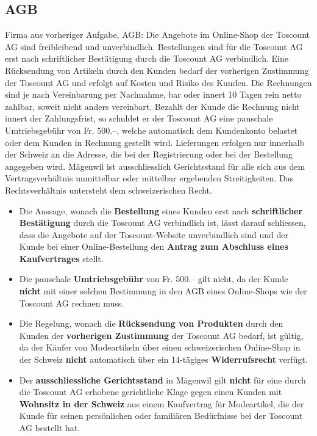 \subsection{AGB}
Firma aus vorheriger Aufgabe, AGB: Die Angebote im Online-Shop der Toscount AG sind freibleibend und unverbindlich. Bestellungen sind für die Toscount AG erst nach schriftlicher Bestätigung durch die Toscount AG verbindlich. Eine Rücksendung von Artikeln durch den Kunden bedarf der vorherigen Zustimmung der Toscount AG und erfolgt auf Kosten und Risiko des Kunden. Die Rechnungen sind je nach Vereinbarung per Nachnahme, bar oder innert 10 Tagen rein netto zahlbar, soweit nicht anders vereinbart. Bezahlt der Kunde die Rechnung nicht innert der Zahlungsfrist, so schuldet er der Toscount AG eine pauschale Umtriebsgebühr von Fr. 500.–, welche automatisch dem Kundenkonto belastet oder dem Kunden in Rechnung gestellt wird. Lieferungen erfolgen nur innerhalb der Schweiz an die Adresse, die bei der Registrierung oder bei der Bestellung angegeben wird. Mägenwil ist ausschliesslich Gerichtsstand für alle sich aus dem Vertragsverhältnis unmittelbar oder mittelbar ergebenden Streitigkeiten. Das Rechtsverhältnis untersteht dem schweizerischen Recht.
\begin{itemize}
	\item Die Aussage, wonach die \textbf{Bestellung} eines Kunden erst nach \textbf{schriftlicher Bestätigung} durch die Toscount AG verbindlich ist, lässt darauf schliessen, dass die Angebote auf der Toscount-Website unverbindlich sind und der Kunde bei einer Online-Bestellung den \textbf{Antrag zum Abschluss eines Kaufvertrages} stellt.
	\item Die pauschale \textbf{Umtriebsgebühr} von Fr. 500.– gilt nicht, da der Kunde \textbf{nicht} mit einer solchen Bestimmung in den AGB eines Online-Shops wie der Toscount AG rechnen muss.
	\item Die Regelung, wonach die \textbf{Rücksendung von Produkten} durch den Kunden der \textbf{vorherigen Zustimmung} der Toscount AG bedarf, ist gültig, da der Käufer von Modeartikeln über einen schweizerischen Online-Shop in der Schweiz \textbf{nicht} automatisch über ein 14-tägiges \textbf{Widerrufsrecht} verfügt.
	\item Der \textbf{ausschliessliche Gerichtsstand} in Mägenwil gilt \textbf{nicht} für eine durch die Toscount AG erhobene gerichtliche Klage gegen einen Kunden mit \textbf{Wohnsitz in der Schweiz} aus einem Kaufvertrag für Modeartikel, die der Kunde für seinen persönlichen oder familiären Bedürfnisse bei der Toscount AG bestellt hat.
\end{itemize}

